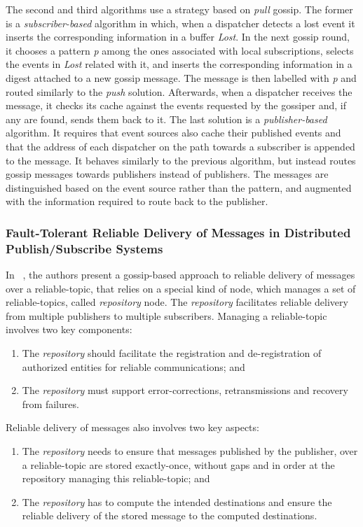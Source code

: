 The second and third algorithms use a strategy based on \textit{pull} gossip. The former is a \textit{subscriber-based} algorithm in which, when a dispatcher detects a lost event it inserts the corresponding information in a buffer \textit{Lost}. In the next gossip round, it chooses a pattern \textit{p} among the ones associated with local subscriptions, selects the events in \textit{Lost} related with it, and inserts the corresponding information in a digest attached to a new gossip message. The message is then labelled with \textit{p} and routed similarly to the \textit{push} solution. Afterwards, when a dispatcher receives the message, it checks its  cache against the events requested by the gossiper and, if any are found, sends them back to it. The last solution is a \textit{publisher-based} algorithm. It requires that event sources also cache their published events and that the address of each dispatcher on the path towards a subscriber is appended to the message. It behaves similarly to the previous algorithm, but instead routes gossip messages towards publishers instead of publishers. The messages are distinguished based on the event source rather than the pattern, and augmented with the information required to route back to the publisher.

\subsubsection{Fault-Tolerant Reliable Delivery of Messages in Distributed Publish/Subscribe Systems}
\label{sec:fault_tolerant_reliable_delivery}

In ~\cite{repository-nodes}, the authors present a gossip-based approach to reliable delivery of messages over a reliable-topic, that relies on a special kind of node, which manages a set of reliable-topics, called \textit{repository} node. The \textit{repository} facilitates reliable delivery from multiple publishers to multiple subscribers. Managing a reliable-topic involves two key components:
\begin{enumerate}
  \item The \textit{repository} should facilitate the registration and de-registration of authorized entities for reliable communications; and
  \item The \textit{repository} must support error-corrections, retransmissions and recovery from failures.
\end{enumerate}

Reliable delivery of messages also involves two key aspects:
\begin{enumerate}
  \item The \textit{repository} needs to ensure that messages published by the publisher, over a reliable-topic are stored exactly-once, without gaps and in order at the repository managing this reliable-topic; and
  \item The \textit{repository} has to compute the intended destinations and ensure the reliable delivery of the stored message to the computed destinations.
\end{enumerate}

